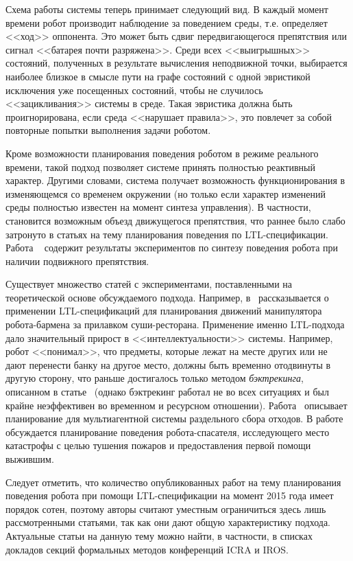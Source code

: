 \documentclass[conference]{IEEEtran}
\begin{document}
Схема работы системы теперь принимает следующий вид. В каждый момент времени 
робот производит наблюдение за поведением среды, т.е. определяет <<ход>> 
оппонента. Это может быть сдвиг передвигающегося препятствия или сигнал <<батарея 
почти разряжена>>. Среди всех <<выигрышных>> состояний, полученных в результате 
вычисления неподвижной точки, выбирается наиболее близкое в смысле пути на графе 
состояний с одной эвристикой исключения уже посещенных состояний, чтобы не 
случилось <<зацикливания>> системы в среде. Такая эвристика должна быть 
проигнорирована, если среда <<нарушает правила>>, это повлечет за собой повторные 
попытки выполнения задачи роботом.

Кроме возможности планирования поведения роботом в режиме реального времени, 
такой подход позволяет системе принять полностью реактивный характер. 
Другими словами, система получает возможность функционирования в изменяющемся со временем окружении 
(но только если характер изменений среды полностью известен на момент синтеза управления).
В частности, становится возможным объезд движущегося препятствия, что раннее было 
слабо затронуто в статьях на тему планирования поведения по LTL-спецификации. 
Работа ~\cite{piterman2006synthesis} содержит результаты экспериментов по 
синтезу поведения робота при наличии подвижного препятствия.

Существует множество статей с экспериментами, поставленными на теоретической 
основе обсуждаемого подхода. Например, в~\cite{he2015towards} рассказывается 
о применении LTL-спецификаций для планирования движений манипулятора 
робота-бармена за прилавком суши-ресторана. Применение именно LTL-подхода 
дало значительный прирост в <<интеллектуальности>> системы. Например, робот 
<<понимал>>, что предметы, которые лежат на месте других или не дают перенести 
банку на другое место, должны быть временно отодвинуты в другую сторону, что 
раньше достигалось только методом \textit{бэктрекинга}, описанном в статье~\cite{srivastava2014combined}
(однако бэктрекинг работал не во всех ситуациях и был крайне неэффективен во 
временном и ресурсном отношении). Работа~\cite{raman2014synthesis} описывает 
планирование для мультиагентной системы раздельного сбора отходов. В 
работе~\cite{vasile2014reactive} обсуждается планирование поведения робота-спасателя, 
исследующего место катастрофы с целью тушения пожаров и предоставления первой 
помощи выжившим.

Следует отметить, что количество опубликованных работ на тему планирования 
поведения робота при помощи LTL-спецификации на момент 2015 года имеет порядок 
сотен, поэтому авторы считают уместным ограничиться здесь лишь рассмотренными 
статьями, так как они дают общую характеристику подхода. Актуальные статьи на 
данную тему можно найти, в частности, в списках докладов секций формальных 
методов конференций ICRA и IROS.
\end{document}
